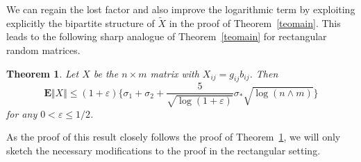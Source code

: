 \documentclass[aop,MSNbibl,dvips]{arximspdf}
\newcommand{\rrVert}{\Vert}
\newcommand{\llVert}{\Vert}
\newtheorem{teo}{Theorem}[section]
\newcommand{\EE}{\mathbf{E}}
\begin{document}
We can regain the lost factor and also improve the logarithmic term by
exploiting explicitly the bipartite structure of $\tilde X$ in the proof
of Theorem~\ref{teomain}. This leads to the following sharp analogue of
Theorem~\ref{teomain} for rectangular random matrices.

%
\begin{teo}
\label{teorect}
Let $X$ be the $n\times m$ matrix with $X_{ij}=g_{ij}b_{ij}$. Then
%
\[
\EE\llVert X\rrVert\le(1+\varepsilon)\biggl\{\sigma_1+
\sigma_2 + \frac{5}{\sqrt{\log(1+\varepsilon)}} \sigma_*\sqrt{\log
(n\wedge m)}\biggr\}
%
\]
%
for any $0<\varepsilon\le1/2$.
\end{teo}

As the proof of this result closely follows the proof of
Theorem~\ref{teorect}, we will only sketch the necessary
modifications to the
proof in the rectangular setting.
\end{document}
